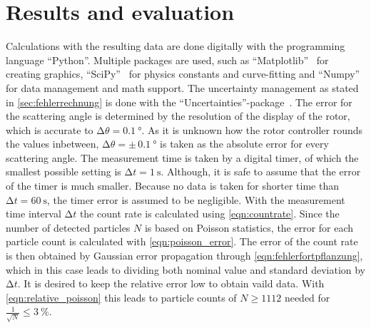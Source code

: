 \section{Results and evaluation}
\label{sec:Auswertung}
Calculations with the resulting data are done digitally with the programming language \enquote{Python}.
Multiple packages are used, such as \enquote{Matplotlib}~\cite{matplotlib} for creating graphics, \enquote{SciPy}~\cite{scipy} for physics constants and curve-fitting and \enquote{Numpy}~\cite{numpy} for data management and math support.
The uncertainty management as stated in \autoref{sec:fehlerrechnung} is done with the \enquote{Uncertainties}-package~\cite{uncertainties}.
\newline\noindent
The error for the scattering angle is determined by the resolution of the display of the rotor, which is accurate to $\increment\theta = \qty{0.1}{\degree}$.
As it is unknown how the rotor controller rounds the values inbetween, $\increment\theta = \pm\,\qty{0.1}{\degree}$ is taken as the absolute error for every scattering angle. 
\newline\noindent
The measurement time is taken by a digital timer, of which the smallest possible setting is $\increment t = \qty{1}{\second}$.
Although, it is safe to assume that the error of the timer is much smaller.
Because no data is taken for shorter time than $\increment t = \qty{60}{\second}$, the timer error is assumed to be negligible.
\newline\noindent
With the measurement time interval $\increment t$ the count rate is calculated using \autoref{eqn:countrate}.
Since the number of detected particles $N$ is based on Poisson statistics, the error for each particle count is calculated with \autoref{eqn:poisson_error}.
The error of the count rate is then obtained by Gaussian error propagation through \autoref{eqn:fehlerfortpflanzung}, which in this case leads to dividing both nominal value and standard deviation by $\increment t$.
It is desired to keep the relative error low to obtain vaild data.
With \autoref{eqn:relative_poisson} this leads to particle counts of $N \geq 1112$ needed for $\frac{1}{\sqrt{N}} \leq \qty{3}{\percent}$.
%
